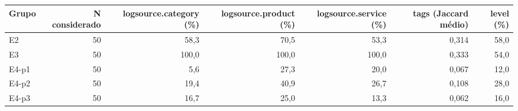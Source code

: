 \begin{tabular}{lrrrrrr}
\toprule
Grupo & N considerado & logsource.category (\%) & logsource.product (\%) & logsource.service (\%) & tags (Jaccard médio) & level (\%) \\
\midrule
E2 & 50 & 58,3 & 70,5 & 53,3 & 0,314 & 58,0 \\
E3 & 50 & 100,0 & 100,0 & 100,0 & 0,333 & 54,0 \\
E4-p1 & 50 & 5,6 & 27,3 & 20,0 & 0,067 & 12,0 \\
E4-p2 & 50 & 19,4 & 40,9 & 26,7 & 0,108 & 28,0 \\
E4-p3 & 50 & 16,7 & 25,0 & 13,3 & 0,062 & 16,0 \\
\bottomrule
\end{tabular}
